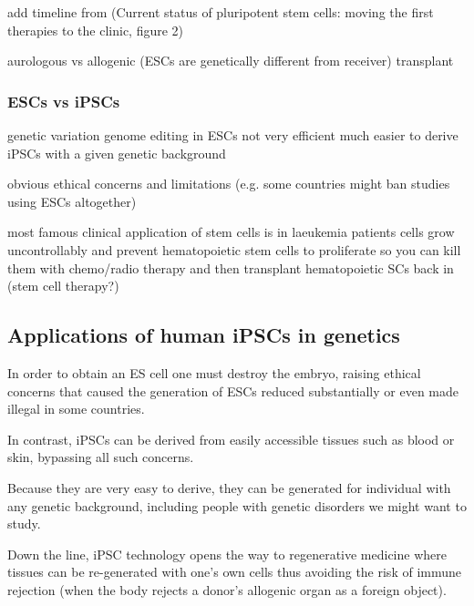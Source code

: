 add timeline from (Current status of pluripotent stem cells: moving the first therapies to the clinic,  figure 2)

\cite{kimbrel2015current}

aurologous vs allogenic (ESCs are genetically different from receiver) transplant

\subsubsection{ESCs vs iPSCs}

genetic variation
genome editing in ESCs not very efficient
much easier to derive iPSCs with a given genetic background

obvious ethical concerns and limitations (e.g. some countries might ban studies using ESCs altogether)

most famous clinical application of stem cells is in laeukemia patients
cells grow uncontrollably and prevent hematopoietic stem cells to proliferate so you can kill them with chemo/radio therapy and then transplant hematopoietic SCs back in (stem cell therapy?)



\subsection{Applications of human iPSCs in genetics}

In order to obtain an ES cell one must destroy the embryo, raising ethical concerns that caused the generation of ESCs reduced substantially or even made illegal in some countries.

In contrast, iPSCs can be derived from easily accessible tissues such as blood or skin, bypassing all such concerns.

Because they are very easy to derive, they can be generated for individual with any genetic background, including people with genetic disorders we might want to study.

Down the line, iPSC technology opens the way to regenerative medicine where tissues can be re-generated with one's own cells thus avoiding the risk of immune rejection (when the body rejects a donor's allogenic organ as a foreign object).

